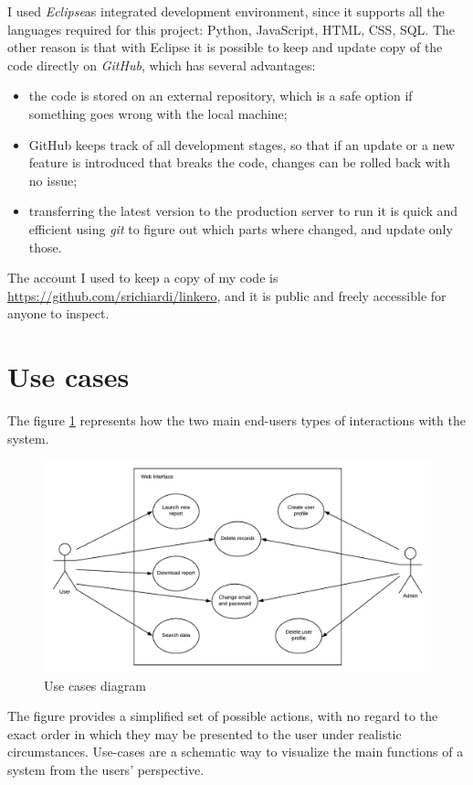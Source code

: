 I used \emph{Eclipse}\texttrademark as integrated development environment, since
it supports all the languages required for this project: Python, JavaScript,
HTML, CSS, SQL. The other reason is that with Eclipse it is possible to keep and
update copy of the code directly on \emph{GitHub}\texttrademark, which has
several advantages:
\begin{itemize}
  \item the code is stored on an external repository, which is a safe option if
  something goes wrong with the local machine;
  \item GitHub keeps track of all development stages, so that if an update or a
  new feature is introduced that breaks the code, changes can be rolled back
  with no issue;
  \item transferring the latest version to the production server to run it is
  quick and efficient using \emph{git} to figure out which parts where changed,
  and update only those.
\end{itemize}

The account I used to keep a copy of my code is
\url{https://github.com/srichiardi/linkero}, and it is public and freely
accessible for anyone to inspect.
\section{Use cases}
The figure \ref{fig:usecases} represents how the two main end-users types of 
interactions with the system.

\begin{figure}[h!]
\centering
\includegraphics[scale=0.6]{imgs/UseCasesDiag.pdf}
\caption{Use cases diagram}
\label{fig:usecases}
\end{figure}

The figure provides a simplified set of possible actions, with no regard to the
exact order in which they may be presented to the user under realistic
circumstances. Use-cases are a schematic way to visualize the main functions of a
system from the users' perspective.

